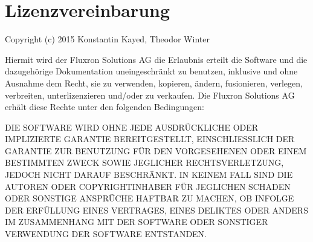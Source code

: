 \WFclear
\pagebreak
\section{Lizenzvereinbarung}
\label{Lizenzvereinbarung}

Copyright (c) 2015 Konstantin Kayed, Theodor Winter

Hiermit wird der Fluxron Solutions AG die Erlaubnis erteilt die Software und die dazugehörige Dokumentation uneingeschränkt zu benutzen, inklusive und ohne Ausnahme dem Recht, sie zu verwenden, kopieren, ändern, fusionieren, verlegen, verbreiten, unterlizenzieren und/oder zu verkaufen. Die Fluxron Solutions AG erhält diese Rechte unter den folgenden Bedingungen:

DIE SOFTWARE WIRD OHNE JEDE AUSDRÜCKLICHE ODER IMPLIZIERTE GARANTIE BEREITGESTELLT, EINSCHLIESSLICH DER GARANTIE ZUR BENUTZUNG FÜR DEN VORGESEHENEN ODER EINEM BESTIMMTEN ZWECK SOWIE JEGLICHER RECHTSVERLETZUNG, JEDOCH NICHT DARAUF BESCHRÄNKT. IN KEINEM FALL SIND DIE AUTOREN ODER COPYRIGHTINHABER FÜR JEGLICHEN SCHADEN ODER SONSTIGE ANSPRÜCHE HAFTBAR ZU MACHEN, OB INFOLGE DER ERFÜLLUNG EINES VERTRAGES, EINES DELIKTES ODER ANDERS IM ZUSAMMENHANG MIT DER SOFTWARE ODER SONSTIGER VERWENDUNG DER SOFTWARE ENTSTANDEN.

\pagebreak

